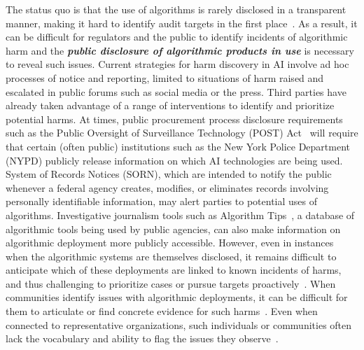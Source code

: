 \documentclass[sigconf]{acmart}
\begin{document}
The status quo is that the use of algorithms is rarely disclosed in a transparent manner, making it hard to identify audit targets in the first place~\cite{veale2018fairness}. As a result, it can be difficult for regulators and the public to identify incidents of algorithmic harm and the \textbf{\textit{public disclosure of algorithmic products in use}} is necessary to reveal such issues. Current strategies for harm discovery in AI involve ad hoc processes of notice and reporting, limited to situations of harm raised and escalated in public forums such as social media or the press. Third parties have already taken advantage of a range of interventions to identify and prioritize potential harms. At times, public procurement process disclosure requirements such as the Public Oversight of Surveillance Technology (POST) Act~\cite{richardson2019confronting} will require that certain (often public) institutions such as the New York Police Department (NYPD) publicly release information on which AI technologies are being used. System of Records Notices (SORN), which are intended to notify the public whenever a federal agency creates, modifies, or eliminates records involving personally identifiable information, may alert parties to potential uses of algorithms. Investigative journalism tools such as Algorithm Tips~\cite{trielli2017algorithm}, a database of algorithmic tools being used by public agencies, can also make information on algorithmic deployment more publicly accessible. However, even in instances when the algorithmic systems are themselves disclosed, it remains difficult to anticipate which of these deployments are linked to known incidents of harms, and thus challenging to prioritize cases or pursue targets proactively~\cite{raji2019actionable}. When communities identify issues with algorithmic deployments, it can be difficult for them to articulate or find concrete evidence for such harms~\cite{katell2019algorithmic}. Even when connected to representative organizations, such individuals or communities often lack the vocabulary and ability to flag the issues they observe~\cite{katell2020toward}. 
\end{document}
